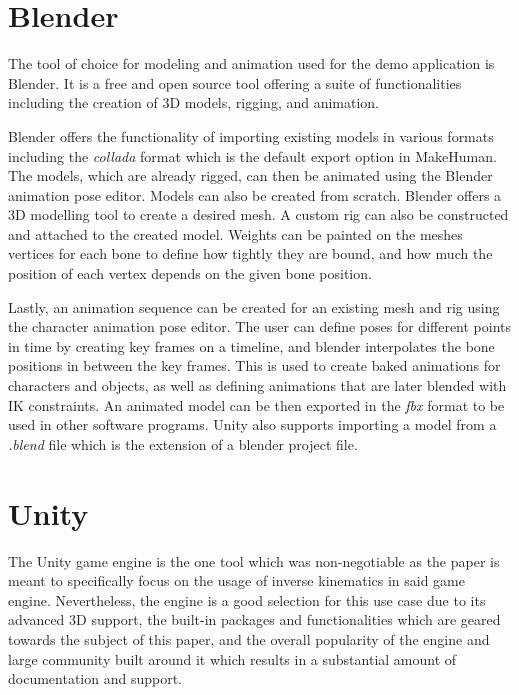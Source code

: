 \section{Blender}
The tool of choice for modeling and animation used for the demo application is
Blender. It is a free and open source tool offering a suite of functionalities
including the creation of 3D models, rigging, and animation. 


Blender offers the functionality of importing existing models in various formats
including the \textit{collada} format \cite{collada} which is the default export
option in MakeHuman. The models, which are already rigged, can then be animated
using the Blender animation pose editor. Models can also be created from
scratch. Blender offers a 3D modelling tool to create a desired mesh. A custom
rig can also be constructed and attached to the created model. Weights can be
painted on the meshes vertices for each bone to define how tightly they are
bound, and how much the position of each vertex depends on the given bone
position. 

Lastly, an animation sequence can be created for an existing mesh and rig using
the character animation pose editor. The user can define poses for different
points in time by creating key frames on a timeline, and blender interpolates the
bone positions in between the key frames. This is used to create baked animations
for characters and objects, as well as defining animations that are later
blended with IK constraints. An animated model can be then exported in the
\textit{fbx} format to be used in other software programs. Unity also supports
importing a model from a \textit{.blend} file which is the extension of
a blender project file. 


\section{Unity}
The Unity game engine is the one tool which was non-negotiable as the paper
is meant to specifically focus on the usage of inverse kinematics in said game
engine. Nevertheless, the engine is a good selection for this use case due to
its advanced 3D support, the built-in packages and functionalities which are
geared towards the subject of this paper, and the overall popularity of the
engine and large community built around it which results in a substantial amount
of documentation and support. 

